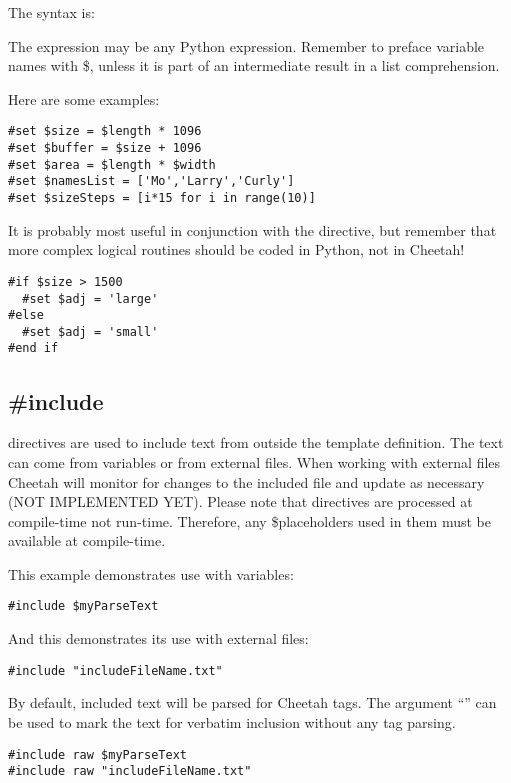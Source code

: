 The syntax is: 

The expression may be any Python expression. Remember to preface variable names
with \$, unless it is part of an intermediate result in a list comprehension.

Here are some examples:
\begin{verbatim}
#set $size = $length * 1096
#set $buffer = $size + 1096
#set $area = $length * $width
#set $namesList = ['Mo','Larry','Curly']
#set $sizeSteps = [i*15 for i in range(10)]
\end{verbatim}

It is probably most useful in conjunction with the  directive, but
remember that more complex logical routines should be coded in Python, not in
Cheetah!
\begin{verbatim}
#if $size > 1500
  #set $adj = 'large'
#else
  #set $adj = 'small'
#end if
\end{verbatim}


\subsection{\#include}
\label{directives.include}

 directives are used to include text from outside the template
definition.  The text can come from  variables or from
external files.  When working with external files Cheetah will monitor for
changes to the included file and update as necessary (NOT IMPLEMENTED YET).
Please note that  directives are processed at compile-time not
run-time.  Therefore, any \$placeholders used in them must be available at
compile-time.

This example demonstrates use with  variables:

\begin{verbatim}
#include $myParseText
\end{verbatim}

And this demonstrates its use with external files:
\begin{verbatim}
#include "includeFileName.txt"
\end{verbatim}

By default, included text will be parsed for Cheetah tags.  The argument
``'' can be used to mark the text for verbatim inclusion without any tag
parsing.

\begin{verbatim}
#include raw $myParseText
#include raw "includeFileName.txt"
\end{verbatim}

